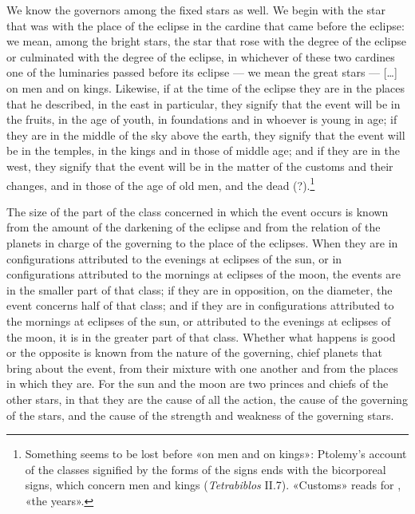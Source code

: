 \documentclass[11pt]{article}
\newcommand{\Fol}[1]{\marginpar{\footnotesize\color{gray}f.\,#1}}
\begin{document}
\par \Fol{28r}We know the governors among the fixed stars as well. We begin with the star that was with the place of the eclipse in the cardine that came before the eclipse: we mean, among the bright stars, the star that rose with the degree of the eclipse or culminated with the degree of the eclipse, in whichever of these two cardines one of the luminaries passed before its eclipse — we mean the great stars — […] on men and on kings. Likewise, if at the time of the eclipse they are in the places that he described, in the east in particular, they signify that the event will be in the fruits, in the age of youth, in foundations and in whoever is young in age; if they are in the middle of the sky above the earth, they signify that the event will be in the temples, in the kings and in those of middle age; and if they are in the west, they signify that the event will be in the matter of the customs and their changes, and in those of the age of old men, and the dead (?).\footnote{Something seems to be lost before «on men and on kings»: Ptolemy's account of the classes signified by the forms of the signs ends with the bicorporeal signs, which concern men and kings (\emph{Tetrabiblos} II.7). «Customs» reads  for , «the years».}\par
\par The size of the part of the class concerned in which the event occurs is known from the amount of the darkening of the eclipse and from the relation of the planets in charge of the governing to the place of the eclipses. When they are in configurations attributed to the evenings at eclipses of the sun, or in configurations attributed to the mornings at eclipses of the moon, the events are in the smaller part of that class; if they are in opposition, on the diameter, the event concerns half of that class; and if they are in configurations attributed to the mornings at eclipses of the sun, or attributed to the evenings at eclipses of the moon, it is in the greater part of that class. Whether what happens is good or the opposite is known from the nature of the governing, chief planets that bring about the event, from their mixture with one another and from the places in which they are. For the sun and the moon are two princes and chiefs of the other stars, in that they are the cause of all the action, the cause of the governing of the stars, and the cause of the strength and weakness of the governing stars.\par
\end{document}
